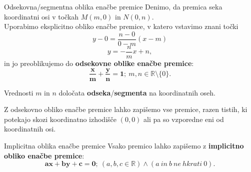         \begin{frame}
            \begin{alertblock}{Odsekovna/segmentna oblika enačbe premice}
                Denimo, da premica seka koordinatni osi v točkah $M(m,0)$ in $N(0,n)$. \\
                Uporabimo eksplicitno obliko enačbe premice, v katero vstavimo znani točki
                $$y-0=\dfrac{n-0}{0-m}(x-m)$$ $$y=-\dfrac{n}{m}x+n,$$
                in  jo preoblikujemo do \textbf{odsekovne oblike enačbe premice}: 
                $$\mathbf{\dfrac{x}{m}+\dfrac{y}{n}=1}; ~m,n\in\mathbb{R}\setminus\{0\}.$$
            \end{alertblock}

            \begin{block}{}
                Vrednosti $m$ in $n$ določata \textbf{odseka}/\textbf{segmenta} na koordinatnih oseh.
            \end{block}

        \end{frame}


        \begin{frame}
            \begin{block}{}
                Z odsekovno obliko enačbe premice lahko zapišemo vse premice, razen tistih, 
                ki potekajo skozi koordinatno izhodišče $(0,0)$ ali pa so vzporedne eni od koordinatnih osi.
            \end{block}

            \begin{alertblock}{Implicitna oblika enačbe premice}
                Vsako premico lahko zapišemo z \textbf{implicitno obliko enačbe premice}:
                $$\mathbf{ax+by+c=0}; ~(a,b,c\in\mathbb{R}) \land (a~in~b~ne~hkrati~0).$$
            \end{alertblock}            
        \end{frame}



